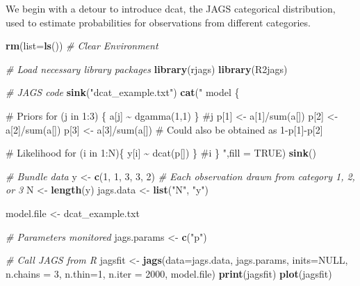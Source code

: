 \documentclass[
]{krantz}
\makeatletter
\newenvironment{Shaded}{\begin{snugshade}}{\end{snugshade}}
\newcommand{\AttributeTok}[1]{\textcolor[rgb]{0.27,0.27,0.27}{#1}}
\newcommand{\CommentTok}[1]{\textcolor[rgb]{0.37,0.37,0.37}{\textit{#1}}}
\newcommand{\ConstantTok}[1]{\textcolor[rgb]{0.37,0.37,0.37}{#1}}
\newcommand{\DecValTok}[1]{\textcolor[rgb]{0.06,0.06,0.06}{#1}}
\newcommand{\FunctionTok}[1]{\textcolor[rgb]{0.27,0.27,0.27}{\textbf{#1}}}
\newcommand{\NormalTok}[1]{#1}
\newcommand{\OtherTok}[1]{\textcolor[rgb]{0.37,0.37,0.37}{#1}}
\newcommand{\StringTok}[1]{\textcolor[rgb]{0.5,0.5,0.5}{#1}}
\newenvironment{kframe}{%
\medskip{}
\setlength{\fboxsep}{.8em}
 \def\at@end@of@kframe{}%
 \ifinner\ifhmode%
  \def\at@end@of@kframe{\end{minipage}}%
  \begin{minipage}{\columnwidth}%
 \fi\fi%
 \def\FrameCommand##1{\hskip\@totalleftmargin \hskip-\fboxsep
 \colorbox{shadecolor}{##1}\hskip-\fboxsep
     \hskip-\linewidth \hskip-\@totalleftmargin \hskip\columnwidth}%
 \MakeFramed {\advance\hsize-\width
   \@totalleftmargin\z@ \linewidth\hsize
   \@setminipage}}%
 {\par\unskip\endMakeFramed%
 \at@end@of@kframe}
\renewenvironment{Shaded}{\begin{kframe}}{\end{kframe}}
\makeatother
\begin{document}
We begin with a detour to introduce dcat, the JAGS categorical distribution, used to estimate probabilities for observations from different categories.

\begin{Shaded}
\begin{Highlighting}[]
\FunctionTok{rm}\NormalTok{(}\AttributeTok{list=}\FunctionTok{ls}\NormalTok{()) }\CommentTok{\# Clear Environment}

\CommentTok{\# Load necessary library packages}
\FunctionTok{library}\NormalTok{(rjags)}
\FunctionTok{library}\NormalTok{(R2jags)}

\CommentTok{\# JAGS code}
\FunctionTok{sink}\NormalTok{(}\StringTok{"dcat\_example.txt"}\NormalTok{)}
\FunctionTok{cat}\NormalTok{(}\StringTok{"}
\StringTok{model \{}

\StringTok{\# Priors}
\StringTok{    for (j in 1:3) \{}
\StringTok{         a[j] \textasciitilde{} dgamma(1,1)}
\StringTok{         \} \#j}
\StringTok{     p[1] \textless{}{-} a[1]/sum(a[])}
\StringTok{     p[2] \textless{}{-} a[2]/sum(a[])}
\StringTok{     p[3] \textless{}{-} a[3]/sum(a[]) \# Could also be obtained as 1{-}p[1]{-}p[2]}

\StringTok{\# Likelihood}
\StringTok{  for (i in 1:N)\{}
\StringTok{    y[i] \textasciitilde{} dcat(p[])}
\StringTok{  \} \#i}
\StringTok{\}}
\StringTok{    "}\NormalTok{,}\AttributeTok{fill =} \ConstantTok{TRUE}\NormalTok{)}
\FunctionTok{sink}\NormalTok{()}

\CommentTok{\# Bundle data}
\NormalTok{y }\OtherTok{\textless{}{-}} \FunctionTok{c}\NormalTok{(}\DecValTok{1}\NormalTok{, }\DecValTok{1}\NormalTok{, }\DecValTok{3}\NormalTok{, }\DecValTok{3}\NormalTok{, }\DecValTok{2}\NormalTok{) }\CommentTok{\# Each observation drawn from category 1, 2, or 3}
\NormalTok{N }\OtherTok{\textless{}{-}} \FunctionTok{length}\NormalTok{(y)}
\NormalTok{jags.data }\OtherTok{\textless{}{-}} \FunctionTok{list}\NormalTok{(}\StringTok{"N"}\NormalTok{, }\StringTok{"y"}\NormalTok{)}

\NormalTok{model.file }\OtherTok{\textless{}{-}} \StringTok{\textquotesingle{}dcat\_example.txt\textquotesingle{}}

\CommentTok{\# Parameters monitored}
\NormalTok{jags.params }\OtherTok{\textless{}{-}} \FunctionTok{c}\NormalTok{(}\StringTok{"p"}\NormalTok{)}

\CommentTok{\# Call JAGS from R}
\NormalTok{jagsfit }\OtherTok{\textless{}{-}} \FunctionTok{jags}\NormalTok{(}\AttributeTok{data=}\NormalTok{jags.data, jags.params, }\AttributeTok{inits=}\ConstantTok{NULL}\NormalTok{,}
                \AttributeTok{n.chains =} \DecValTok{3}\NormalTok{, }\AttributeTok{n.thin=}\DecValTok{1}\NormalTok{, }\AttributeTok{n.iter =} \DecValTok{2000}\NormalTok{,}
\NormalTok{                model.file)}
\FunctionTok{print}\NormalTok{(jagsfit)}
\FunctionTok{plot}\NormalTok{(jagsfit)}
\end{Highlighting}
\end{Shaded}
\end{document}
